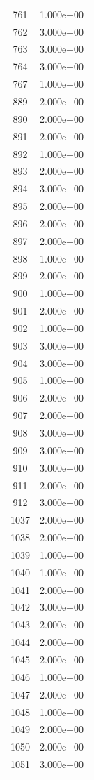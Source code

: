 \documentclass[12pt]{article}
\begin{document}
\begin{longtable}{@{}cc@{}}
761 & 1.000e+00 \\
762 & 3.000e+00 \\
763 & 3.000e+00 \\
764 & 3.000e+00 \\
767 & 1.000e+00 \\
889 & 2.000e+00 \\
890 & 2.000e+00 \\
891 & 2.000e+00 \\
892 & 1.000e+00 \\
893 & 2.000e+00 \\
894 & 3.000e+00 \\
895 & 2.000e+00 \\
896 & 2.000e+00 \\
897 & 2.000e+00 \\
898 & 1.000e+00 \\
899 & 2.000e+00 \\
900 & 1.000e+00 \\
901 & 2.000e+00 \\
902 & 1.000e+00 \\
903 & 3.000e+00 \\
904 & 3.000e+00 \\
905 & 1.000e+00 \\
906 & 2.000e+00 \\
907 & 2.000e+00 \\
908 & 3.000e+00 \\
909 & 3.000e+00 \\
910 & 3.000e+00 \\
911 & 2.000e+00 \\
912 & 3.000e+00 \\
1037 & 2.000e+00 \\
1038 & 2.000e+00 \\
1039 & 1.000e+00 \\
1040 & 1.000e+00 \\
1041 & 2.000e+00 \\
1042 & 3.000e+00 \\
1043 & 2.000e+00 \\
1044 & 2.000e+00 \\
1045 & 2.000e+00 \\
1046 & 1.000e+00 \\
1047 & 2.000e+00 \\
1048 & 1.000e+00 \\
1049 & 2.000e+00 \\
1050 & 2.000e+00 \\
1051 & 3.000e+00 \\

\end{longtable}
\end{document}
